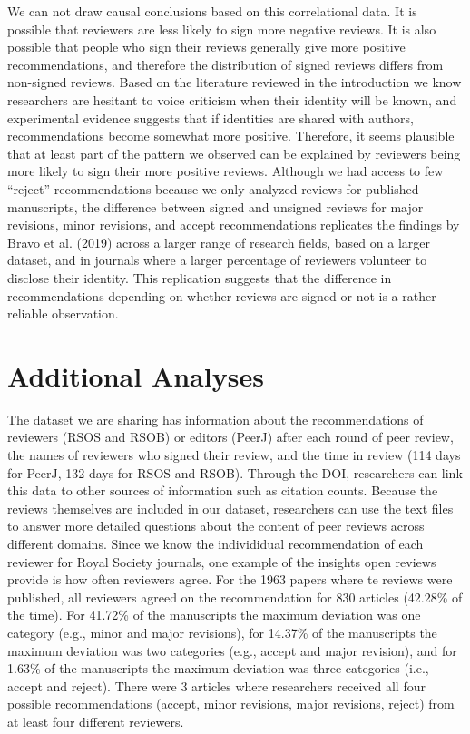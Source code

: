 \documentclass[,jou, a4paper,floatsintext]{apa6}
\begin{document}
We can not draw causal conclusions based on this correlational data. It is possible that reviewers are less likely to sign more negative reviews. It is also possible that people who sign their reviews generally give more positive recommendations, and therefore the distribution of signed reviews differs from non-signed reviews. Based on the literature reviewed in the introduction we know researchers are hesitant to voice criticism when their identity will be known, and experimental evidence suggests that if identities are shared with authors, recommendations become somewhat more positive. Therefore, it seems plausible that at least part of the pattern we observed can be explained by reviewers being more likely to sign their more positive reviews. Although we had access to few \enquote{reject} recommendations because we only analyzed reviews for published manuscripts, the difference between signed and unsigned reviews for major revisions, minor revisions, and accept recommendations replicates the findings by Bravo et al. (2019) across a larger range of research fields, based on a larger dataset, and in journals where a larger percentage of reviewers volunteer to disclose their identity. This replication suggests that the difference in recommendations depending on whether reviews are signed or not is a rather reliable observation.

\hypertarget{additional-analyses}{%
\section{Additional Analyses}\label{additional-analyses}}

The dataset we are sharing has information about the recommendations of reviewers (RSOS and RSOB) or editors (PeerJ) after each round of peer review, the names of reviewers who signed their review, and the time in review (114 days for PeerJ, 132 days for RSOS and RSOB). Through the DOI, researchers can link this data to other sources of information such as citation counts. Because the reviews themselves are included in our dataset, researchers can use the text files to answer more detailed questions about the content of peer reviews across different domains. Since we know the individidual recommendation of each reviewer for Royal Society journals, one example of the insights open reviews provide is how often reviewers agree. For the 1963 papers where te reviews were published, all reviewers agreed on the recommendation for 830 articles (42.28\% of the time). For 41.72\% of the manuscripts the maximum deviation was one category (e.g., minor and major revisions), for 14.37\% of the manuscripts the maximum deviation was two categories (e.g., accept and major revision), and for 1.63\% of the manuscripts the maximum deviation was three categories (i.e., accept and reject). There were 3 articles where researchers received all four possible recommendations (accept, minor revisions, major revisions, reject) from at least four different reviewers.
\end{document}
